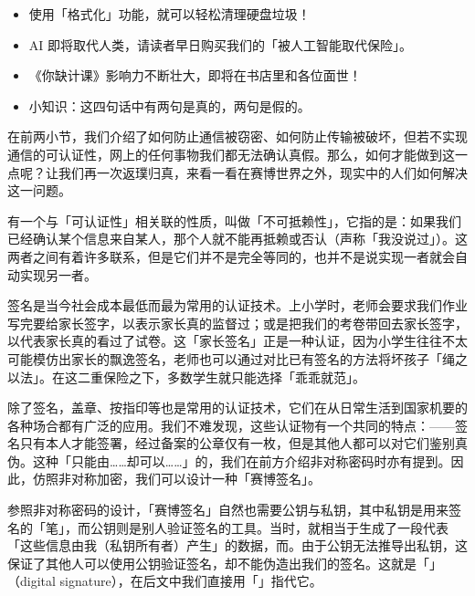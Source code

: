 \begin{quoting}
  \begin{itemize}
    \item 使用「格式化」功能，就可以轻松清理硬盘垃圾！
    \item AI 即将取代人类，请读者早日购买我们的「被人工智能取代保险」。
    \item 《你缺计课》影响力不断壮大，即将在书店里和各位面世！
    \item 小知识：这四句话中有两句是真的，两句是假的。
  \end{itemize}
\end{quoting}

在前两小节，我们介绍了如何防止通信被窃密、如何防止传输被破坏，但若不实现通信的可认证性，网上的任何事物我们都无法确认真假。那么，如何才能做到这一点呢？让我们再一次返璞归真，来看一看在赛博世界之外，现实中的人们如何解决这一问题。

\begin{note}
  有一个与「可认证性」相关联的性质，叫做「不可抵赖性」，它指的是：如果我们已经确认某个信息来自某人，那个人就不能再抵赖或否认（声称「我没说过」）。这两者之间有着许多联系，但是它们并不是完全等同的，也并不是说实现一者就会自动实现另一者。
\end{note}

签名是当今社会成本最低而最为常用的认证技术。上小学时，老师会要求我们作业写完要给家长签字，以表示家长真的监督过；或是把我们的考卷带回去家长签字，以代表家长真的看过了试卷。这「家长签名」正是一种认证，因为小学生往往不太可能模仿出家长的飘逸签名，老师也可以通过对比已有签名的方法将坏孩子「绳之以法」。在这二重保险之下，多数学生就只能选择「乖乖就范」。

除了签名，盖章、按指印等也是常用的认证技术，它们在从日常生活到国家机要的各种场合都有广泛的应用。我们不难发现，这些认证物有一个共同的特点：——签名只有本人才能签署，经过备案的公章仅有一枚，但是其他人都可以对它们鉴别真伪。这种「只能由……却可以……」的，我们在前方介绍非对称密码时亦有提到。因此，仿照非对称加密，我们可以设计一种「赛博签名」。

参照非对称密码的设计，「赛博签名」自然也需要公钥与私钥，其中私钥是用来签名的「笔」，而公钥则是别人验证签名的工具。当时，就相当于生成了一段代表「这些信息由我（私钥所有者）产生」的数据，而。由于公钥无法推导出私钥，这保证了其他人可以使用公钥验证签名，却不能伪造出我们的签名。这就是「」（digital signature），在后文中我们直接用「」指代它。

